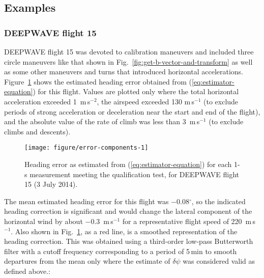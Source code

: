 \documentclass[english,british,amt,bookmarks=false,unicode=true]{copernicus}\usepackage[]{graphicx}\usepackage[]{color}
\makeatletter
\def\maxwidth{ %
  \ifdim\Gin@nat@width>\linewidth
    \linewidth
  \else
    \Gin@nat@width
  \fi
}
\newenvironment{knitrout}{}{} %
\makeatother
\begin{document}
\subsection{Examples\label{sub:Examples-roll}}


\subsubsection{DEEPWAVE flight 15}

DEEPWAVE flight 15 was devoted to calibration maneuvers and included
three circle maneuvers like that shown in Fig.~\ref{fig:get-b-vector-and-transform}
as well as some other maneuvers and turns that introduced horizontal
accelerations. Figure~\ref{fig:error-components} shows the estimated
heading error obtained from (\ref{eq:estimator-equation}) for this
flight. Values are plotted only where the total horizontal acceleration
exceeded 1~m\,s$^{-2}$, the airspeed exceeded 130 m\,s$^{-1}$
(to exclude periods of strong acceleration or deceleration near the
start and end of the flight), and the absolute value of the rate of
climb was less than 3~m\,s$^{-1}$ (to exclude climbs and descents). 

\begin{knitrout}
\color{fgcolor}\begin{figure}
\texttt{[image: figure/error-components-1]} \caption{Heading error as estimated from (\ref{eq:estimator-equation}) for each 1-s measurement meeting the qualification test, for DEEPWAVE flight 15 (3 July 2014).}\label{fig:error-components}
\end{figure}


\end{knitrout}

The mean estimated heading error for this flight was \ensuremath{-0.08}$^{\circ}$,
so the indicated heading correction is significant and would change
the lateral component of the horizontal wind by about \ensuremath{-0.3}~m\,s$^{-1}$
for a representative flight speed of 220~m\,s$^{-1}$. Also shown
in Fig.~\ref{fig:error-components}, as a red line, is a smoothed
representation of the heading correction. This was obtained using
a third-order low-pass Butterworth filter with a cutoff frequency
corresponding to a period of 5\,min to smooth departures from the
mean only where the estimate of $\delta\psi$ was considered valid
as defined above.:
\end{document}

